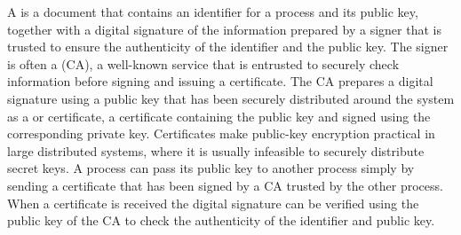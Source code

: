 A  is a document that contains an identifier for a process
and its public key, together with a digital signature of the information
prepared by a signer that is trusted to ensure the authenticity of
the identifier and the public key.
The signer is often a  (CA), a well-known
service that is entrusted to securely check information before signing and issuing
a certificate. The CA prepares a digital signature using a public key that has been securely
distributed around the system as a  or  certificate,
a certificate containing the public key and signed using the corresponding private key.
Certificates make public-key encryption practical in large distributed systems,
where it is usually infeasible to securely distribute secret keys.
A process can pass its public key to another process simply by sending a
certificate that has been signed by a CA trusted by the other process.
When a certificate is received the digital signature can be verified using the
public key of the CA to check the authenticity of the identifier and public key.

